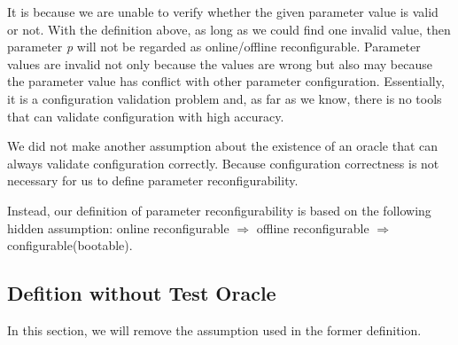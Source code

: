 It is because we are unable to verify whether the given parameter value is valid or not. With the definition above, as long as we could find one invalid value, then parameter \textit{p} will not be regarded as online/offline reconfigurable. Parameter values are invalid not only because the values are wrong but also may because the parameter value has conflict with other parameter configuration. Essentially, it is a configuration validation problem and, as far as we know, there is no tools that can validate configuration with high accuracy. 

We did not make another assumption about the existence of an oracle that can always validate configuration correctly. Because  configuration correctness is not necessary for us to define parameter reconfigurability.

Instead, our definition of parameter reconfigurability is based on the following hidden assumption: online reconfigurable $\Longrightarrow$ offline reconfigurable $\Longrightarrow$ configurable(bootable).



\subsection{Defition without Test Oracle}
In this section, we will remove the assumption used in the former definition.












